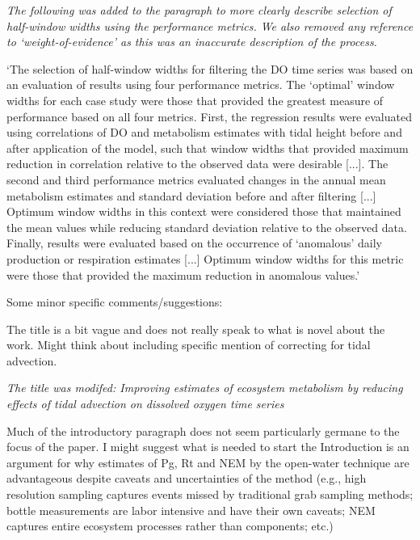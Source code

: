\documentclass[letterpaper,12pt]{article}\usepackage[]{graphicx}\usepackage[]{color}
\begin{document}
{\it The following was added to the paragraph to more clearly describe selection of half-window widths using the performance metrics.  We also removed any reference to `weight-of-evidence' as this was an inaccurate description of the process.

`The selection of half-window widths for filtering the DO time series was based on an evaluation of results using four performance metrics.  The `optimal' window widths for each case study were those that provided the greatest measure of performance based on all four metrics.  First, the regression results were evaluated using correlations of DO and metabolism estimates with tidal height before and after application of the model, such that window widths that provided maximum reduction in correlation relative to the observed data were desirable [...]. The second and third performance metrics evaluated changes in the annual mean metabolism estimates and standard deviation before and after filtering [...] Optimum window widths in this context were considered those that maintained the mean values while reducing standard deviation relative to the observed data. Finally, results were evaluated based on the occurrence of `anomalous' daily production or respiration estimates [...] Optimum window widths for this metric were those that provided the maximum reduction in anomalous values.'
}

Some minor specific comments/suggestions:

The title is a bit vague and does not really speak to what is novel about the work. Might think about including specific mention of correcting for tidal advection.

{\it The title was modifed: Improving estimates of ecosystem metabolism by reducing effects of tidal advection on dissolved oxygen time series}

Much of the introductory paragraph does not seem particularly germane to the focus of the paper. I might suggest what is needed to start the Introduction is an argument for why estimates of Pg, Rt and NEM by the open-water technique are advantageous despite caveats and uncertainties of the method (e.g., high resolution sampling captures events missed by traditional grab sampling methods; bottle measurements are labor intensive and have their own caveats; NEM captures entire ecosystem processes rather than components; etc.)
\end{document}
